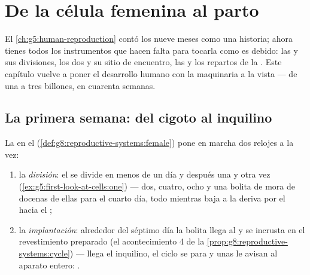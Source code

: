 \chapter{De la célula femenina al parto}\label{ch:g8:from-egg-to-birth}

El \cref{ch:g5:human-reproduction} contó los nueve meses como una
historia; ahora tienes todos los instrumentos que hacen falta para
tocarla como es debido: las  y sus divisiones, los dos  y
su sitio de encuentro, las  y los repartos de la . Este
capítulo vuelve a poner el desarrollo humano con la maquinaria a la
vista --- de una  a tres billones, en cuarenta semanas.

\section{La primera semana: del cigoto al inquilino}

\begin{proposition}\label{prop:g8:from-egg-to-birth:firstweek}
La  en el 
(\cref{def:g8:reproductive-systems:female}) pone en marcha dos relojes
a la vez:
\begin{enumerate}
  \item la \emph{división}: el  se divide en menos de un día y
        después una y otra vez
        (\cref{ex:g5:first-look-at-cells:one}) --- dos, cuatro, ocho
         y una bolita de mora de docenas de ellas para el cuarto
        día, todo mientras baja a la deriva por el  hacia el
        ;
  \item la \emph{implantación}: alrededor del séptimo día la bolita
        llega al  y se incrusta en el revestimiento preparado (el
        acontecimiento 4 de la
        \cref{prop:g8:reproductive-systems:cycle}) --- llega el
        inquilino, el ciclo se para y unas  le avisan al
        aparato entero: .
\end{enumerate}
\end{proposition}
\admitted

